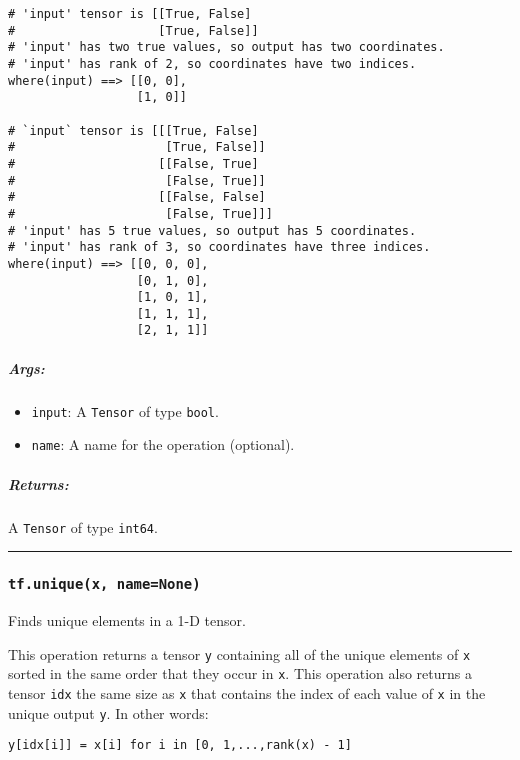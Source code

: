 \begin{verbatim}
# 'input' tensor is [[True, False]
#                    [True, False]]
# 'input' has two true values, so output has two coordinates.
# 'input' has rank of 2, so coordinates have two indices.
where(input) ==> [[0, 0],
                  [1, 0]]

# `input` tensor is [[[True, False]
#                     [True, False]]
#                    [[False, True]
#                     [False, True]]
#                    [[False, False]
#                     [False, True]]]
# 'input' has 5 true values, so output has 5 coordinates.
# 'input' has rank of 3, so coordinates have three indices.
where(input) ==> [[0, 0, 0],
                  [0, 1, 0],
                  [1, 0, 1],
                  [1, 1, 1],
                  [2, 1, 1]]
\end{verbatim}

\subparagraph{Args: }\label{args-57}

\begin{itemize}
\tightlist
\item
  \texttt{input}: A \texttt{Tensor} of type \texttt{bool}.
\item
  \texttt{name}: A name for the operation (optional).
\end{itemize}

\subparagraph{Returns: }\label{returns-57}

A \texttt{Tensor} of type \texttt{int64}.

\begin{center}\rule{0.5\linewidth}{\linethickness}\end{center}

\subsubsection{\texorpdfstring{\texttt{tf.unique(x,\ name=None)}
}{tf.unique(x, name=None) }}\label{tf.uniquex-namenone}

Finds unique elements in a 1-D tensor.

This operation returns a tensor \texttt{y} containing all of the unique
elements of \texttt{x} sorted in the same order that they occur in
\texttt{x}. This operation also returns a tensor \texttt{idx} the same
size as \texttt{x} that contains the index of each value of \texttt{x}
in the unique output \texttt{y}. In other words:

\texttt{y{[}idx{[}i{]}{]}\ =\ x{[}i{]}\ for\ i\ in\ {[}0,\ 1,...,rank(x)\ -\ 1{]}}

